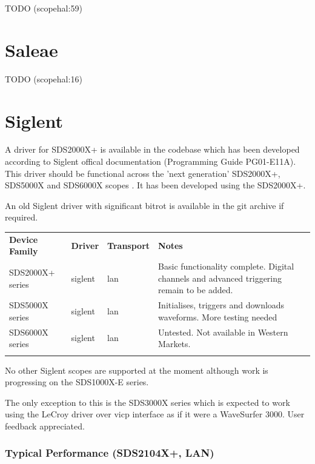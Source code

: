 TODO (scopehal:59)

\section{Saleae}
TODO (scopehal:16)

\section{Siglent}

A driver for SDS2000X+ is available in the codebase which has been developed according to Siglent offical documentation
(Programming Guide PG01-E11A). This driver should be functional across the 'next generation' SDS2000X+, SDS5000X and
SDS6000X scopes . It has been developed using the SDS2000X+.

An old Siglent driver with significant bitrot is available in the git archive if required.\\

\begin{tabularx}{16cm}{lllX}
\thickhline
\textbf{Device Family} & \textbf{Driver} & \textbf{Transport} & \textbf{Notes} \\
\thickhline
SDS2000X+ series & siglent & lan & Basic functionality complete. Digital channels and advanced triggering remain to be added. \\
\thickhline
SDS5000X series & siglent & lan & Initialises, triggers and downloads waveforms. More testing needed \\
\thickhline
SDS6000X series & siglent & lan & Untested. Not available in Western Markets. \\
\thickhline
\end{tabularx}

No other Siglent scopes are supported at the moment although work is progressing on the SDS1000X-E series.

The only exception to this is the SDS3000X series which is expected to work using the LeCroy driver over vicp interface
as if it were a WaveSurfer 3000. User feedback appreciated.\\

\subsubsection{Typical Performance (SDS2104X+, LAN)}

